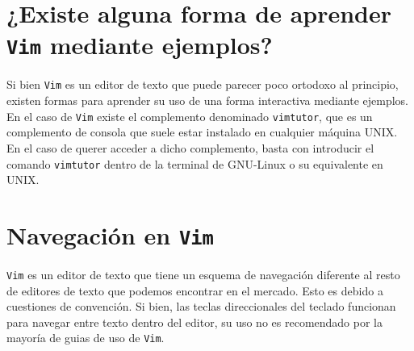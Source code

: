 \documentclass[10pt]{article}
\begin{document}
\section{¿Existe alguna forma de aprender \texttt{Vim} mediante ejemplos?}
Si bien \texttt{Vim} es un editor de texto que puede parecer poco ortodoxo al principio, existen formas para aprender su uso de una forma interactiva mediante ejemplos. En el caso de \texttt{Vim} existe el complemento denominado \texttt{vimtutor}, que es un complemento de consola que suele estar instalado en cualquier máquina UNIX. En el caso de querer acceder a dicho complemento, basta con introducir el comando \texttt{vimtutor} dentro de la terminal de GNU-Linux o su equivalente en UNIX. 
\section{Navegación en \texttt{Vim}}
\texttt{Vim} es un editor de texto que tiene un esquema de navegación diferente al resto de editores de texto que podemos encontrar en el mercado. Esto es debido a cuestiones de convención. 
Si bien, las teclas direccionales del teclado funcionan para navegar entre texto dentro del editor, su uso no es recomendado por la mayoría de guias de uso de \texttt{Vim}. 
\end{document}
